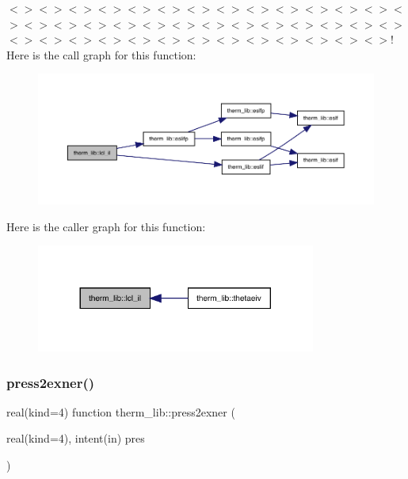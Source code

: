$<$$>$$<$$>$$<$$>$$<$$>$$<$$>$$<$$>$$<$$>$$<$$>$$<$$>$$<$$>$$<$$>$$<$$>$$<$$>$$<$$>$$<$$>$$<$$>$$<$$>$$<$$>$$<$$>$$<$$>$$<$$>$$<$$>$$<$$>$$<$$>$$<$$>$$<$$>$$<$$>$$<$$>$$<$$>$$<$$>$$<$$>$$<$$>$$<$$>$$<$$>$$<$$>$$<$$>$$<$$>$$<$$>$$<$$>$$<$$>$! Here is the call graph for this function\+:
\nopagebreak
\begin{figure}[H]
\begin{center}
\leavevmode
\includegraphics[width=350pt]{namespacetherm__lib_a0b1c333335dfb4af1c56bc56a0e45440_cgraph}
\end{center}
\end{figure}
Here is the caller graph for this function\+:
\nopagebreak
\begin{figure}[H]
\begin{center}
\leavevmode
\includegraphics[width=260pt]{namespacetherm__lib_a0b1c333335dfb4af1c56bc56a0e45440_icgraph}
\end{center}
\end{figure}
\mbox{\label{namespacetherm__lib_a4e2091a1a5d89a568a252369122ecb39}} 
\subsubsection{\texorpdfstring{press2exner()}{press2exner()}}
{\footnotesize\ttfamily real(kind=4) function therm\+\_\+lib\+::press2exner (\begin{DoxyParamCaption}\item[{real(kind=4), intent(in)}]{pres }\end{DoxyParamCaption})}

